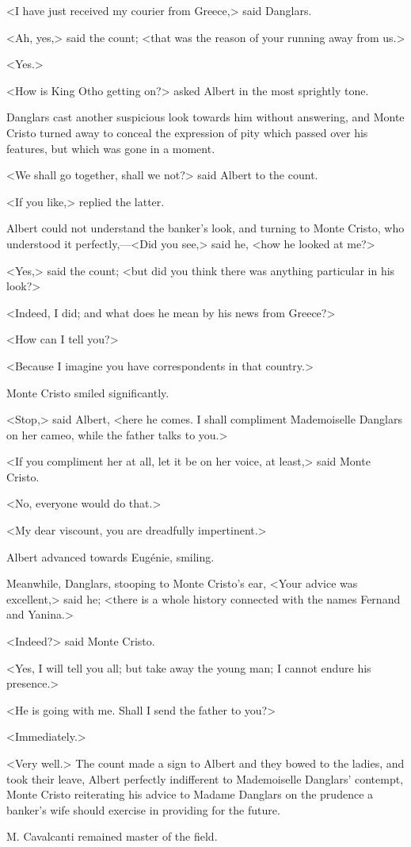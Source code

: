  <I have just received my courier from Greece,> said Danglars. 

 <Ah, yes,> said the count; <that was the reason of your running away from us.> 

 <Yes.> 

 <How is King Otho getting on?> asked Albert in the most sprightly tone. 

 Danglars cast another suspicious look towards him without answering, and Monte Cristo turned away to conceal the expression of pity which passed over his features, but which was gone in a moment. 

 <We shall go together, shall we not?> said Albert to the count. 

 <If you like,> replied the latter. 

 Albert could not understand the banker's look, and turning to Monte Cristo, who understood it perfectly,—<Did you see,> said he, <how he looked at me?> 

 <Yes,> said the count; <but did you think there was anything particular in his look?> 

 <Indeed, I did; and what does he mean by his news from Greece?> 

 <How can I tell you?> 

 <Because I imagine you have correspondents in that country.> 

 Monte Cristo smiled significantly. 

 <Stop,> said Albert, <here he comes. I shall compliment Mademoiselle Danglars on her cameo, while the father talks to you.> 

 <If you compliment her at all, let it be on her voice, at least,> said Monte Cristo. 

 <No, everyone would do that.> 

 <My dear viscount, you are dreadfully impertinent.> 

 Albert advanced towards Eugénie, smiling. 

 Meanwhile, Danglars, stooping to Monte Cristo's ear, <Your advice was excellent,> said he; <there is a whole history connected with the names Fernand and Yanina.> 

 <Indeed?> said Monte Cristo. 

 <Yes, I will tell you all; but take away the young man; I cannot endure his presence.> 

 <He is going with me. Shall I send the father to you?> 

 <Immediately.> 

 <Very well.> The count made a sign to Albert and they bowed to the ladies, and took their leave, Albert perfectly indifferent to Mademoiselle Danglars' contempt, Monte Cristo reiterating his advice to Madame Danglars on the prudence a banker's wife should exercise in providing for the future. 

 M. Cavalcanti remained master of the field. 